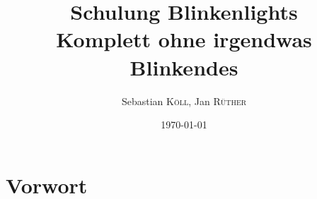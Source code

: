 \documentclass{article}
\title{Schulung Blinkenlights\\
	\large Komplett ohne irgendwas Blinkendes}
\author{Sebastian \textsc{Köll}, Jan \textsc{Rüther}} %
\date{\today} %
\begin{document}
	
\maketitle %

\section{Vorwort}
\blindtext


%
\end{document}
